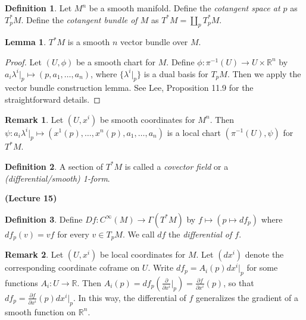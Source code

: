 \documentclass[10pt,letterpaper,cm]{nupset}
\theoremstyle{definition}
\newtheorem*{definition}{Definition}
\newtheorem{remark}{Remark}
\newtheorem{lemma}{Lemma}
\newcommand{\R}{\mathbb R}
\newcommand{\1}{\mathbf{1}}
\newcommand{\0}{\vec 0}
\begin{document}
\begin{definition}
Let $M^n$ be a smooth manifold. Define the \textit{cotangent space at $p$} as $T_p^{\ast}M$. Define the \textit{cotangent bundle of $M$} as $T^{\ast}M = \coprod_p T_p^{\ast}M$.
\end{definition}

\begin{lemma}
$T^{\ast}M$ is a smooth $n$ vector bundle over $M$.
\end{lemma}
\begin{proof}
Let $(U, \phi)$ be a smooth chart for $M$. Define $\phi : \pi^{-1}(U) \to U \times \R^n$ by $a_i \lambda^i\rvert_p \mapsto (p, a_1, \ldots, a_n)$, where $\{\lambda^i \rvert_p\}$ is a dual basis for $T_pM$. Then we apply the vector bundle construction lemma. See Lee, Proposition 11.9 for the straightforward details.
\end{proof}

\begin{remark}
Let $(U, x^i)$ be smooth coordinates for $M^n$. Then $\psi: a_i\lambda^i\rvert_p \mapsto (x^1(p), \ldots, x^n(p), a_1, \ldots, a_n)$ is a local chart $(\pi^{-1}(U), \psi)$ for $T^{\ast}M$.
\end{remark}

\begin{definition}
A section of $T^{\ast}M$ is called a \textit{covector field} or a \textit{(differential/smooth) 1-form}.
\end{definition}

\begin{center}
{\textbf{(Lecture 15)}} 
\end{center}

\begin{definition}
Define $Df : C^{\infty}(M) \to \Gamma(T^{\ast}M)$ by $f \mapsto (p\mapsto df_p)$ where $df_p(v) = vf$ for every $v\in T_pM$. We call $df$ the \textit{differential of $f$}.
\end{definition}

\begin{remark}
Let $(U, x^i)$ be local coordinates for $M$. Let $(dx^i)$ denote the corresponding coordinate coframe on $U$. Write $df_p = A_i(p)dx^i\rvert_p$ for some functions $A_i : U \to \R$. Then $A_i(p) = df_p(\frac{\partial}{\partial{x^i}}\rvert_p) = \frac{\partial{f}}{\partial{x^i}}(p)$, so that $df_p = \frac{\partial{f}}{\partial{x^i}}(p) dx^i\rvert_p$. In this way, the differential of $f$ generalizes the gradient of a smooth function on $\R^n$.
\end{remark}
\end{document}
